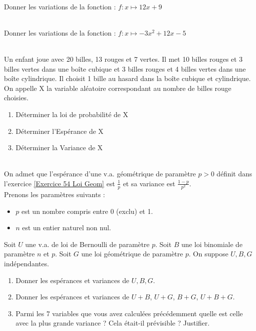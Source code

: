 \documentclass[12pt,fleqn]{report} %
\begin{document}
\begin{exercise}\label{Exercice 16}\text{ }\\
	Donner les variations de la fonction : $f : x \mapsto 12x+9$
\end{exercise}

\begin{exercise}\label{Exercice 39}\text{ }\\
	Donner les variations de la fonction : $f : x \mapsto -3x^2+12x-5$
\end{exercise}

\begin{exercise}\label{Exercice 43}\text{ }\\
	Un enfant joue avec 20 billes, 13 rouges et 7 vertes. Il met 10 billes rouges et 3 billes vertes dans une boîte cubique et 3 billes rouges et 4 billes vertes dans une boîte cylindrique. Il choisit 1 bille au hasard dans la boîte cubique et cylindrique. \bigskip
	\\
	On appelle X la variable aléatoire correspondant au nombre de billes rouge choisies.
	
	\begin{enumerate}
		\item {Déterminer la loi de probabilité de X} 
		
		\item {Déterminer l'Espérance de X}
		
		
		\item {Déterminer la Variance de X}
		
	\end{enumerate}
\end{exercise}

\begin{exercise}\label{Exercice 55}\text{ }\\
	On admet que l'espérance d'une v.a. géométrique de paramètre $p>0$ définit dans l'exercice \ref{Exercice 54 Loi Geom} est $\frac{1}{p}$ et sa variance est $\frac{1-p}{p^2}$.\\
	
	Prenons les paramètres suivants : \begin{itemize}
		\item $p$ est un nombre compris entre 0 (exclu) et 1.
		\item $n$ est un entier naturel non nul.
	\end{itemize}
	Soit $U$ une v.a. de loi de Bernoulli de paramètre $p$. Soit $B$ une loi binomiale de paramètre $n$ et $p$. Soit $G$ une loi géométrique de paramètre $p$. On suppose $U,B,G$ indépendantes.
	\begin{enumerate}
		\item Donner les espérances et variances de $U,B,G$.
		\item Donner les espérances et variances de $U+B$, $U+G$, $B+G$, $U+B+G$.
		\item Parmi les 7 variables que vous avez calculées précédemment quelle est celle avec la plus grande variance ? Cela était-il prévisible ? Justifier.
	\end{enumerate}
\end{exercise}
\end{document}
